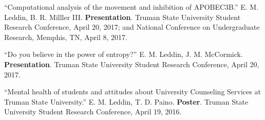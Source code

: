 \documentclass[letterpaper,11pt]{article}
\begin{document}
\begin{etaremune}[start=10]
{  \item \textnormal{``Computational analysis of the movement and inhibition of APOBEC3B.'' E. M. Leddin, B. R. Milller III. \textbf{Presentation}. Truman State University Student Research Conference, April 20, 2017; and National Conference on Undergraduate Research, Memphis, TN, April 8, 2017.}
  \item \textnormal{``Do you believe in the power of entropy?'' E. M. Leddin, J. M. McCormick. \textbf{Presentation}. Truman State University Student Research Conference, April 20, 2017.}
  \item \textnormal{``Mental health of students and attitudes about University Counseling Services at Truman State University.'' E. M. Leddin, T. D. Paino. \textbf{Poster}. Truman State University Student Research Conference, April 19, 2016.}
  }
\end{etaremune}

\end{document}
